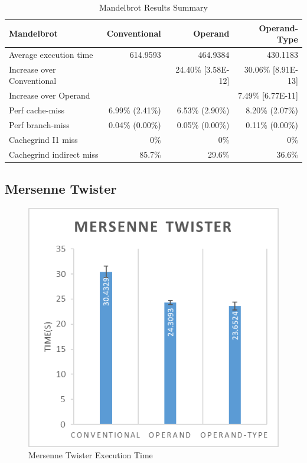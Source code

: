\documentclass[english,a4paper,12pt]{report}
\begin{document}
\begin{table}[!htb]
  \begin{center}
    \begin{tabular}{lrrr}
      Mandelbrot & Conventional & Operand & Operand-Type\\
      \hline
      Average execution time & 614.9593 & 464.9384 & 430.1183\\
      Increase over Conventional &  & 24.40\% [3.58E-12] & 30.06\% [8.91E-13]\\
      Increase over Operand &  &  & 7.49\% [6.77E-11]\\
      Perf cache-miss & 6.99\% (2.41\%) & 6.53\% (2.90\%) & 8.20\% (2.07\%)\\
      Perf branch-miss & 0.04\% (0.00\%) & 0.05\% (0.00\%) & 0.11\% (0.00\%)\\
      Cachegrind I1 miss & 0\% & 0\% & 0\%\\
      Cachegrind indirect miss & 85.7\% & 29.6\% & 36.6\%\\
    \end{tabular}
  \end{center}
  \caption{Mandelbrot Results Summary}
\end{table}

\subsection{Mersenne Twister}

\begin{figure}[!htb]
  \centering
  \includegraphics{mersenne.png}
  \caption{Mersenne Twister Execution Time}
  \label{fig:mersenne-time}
\end{figure}
\end{document}
